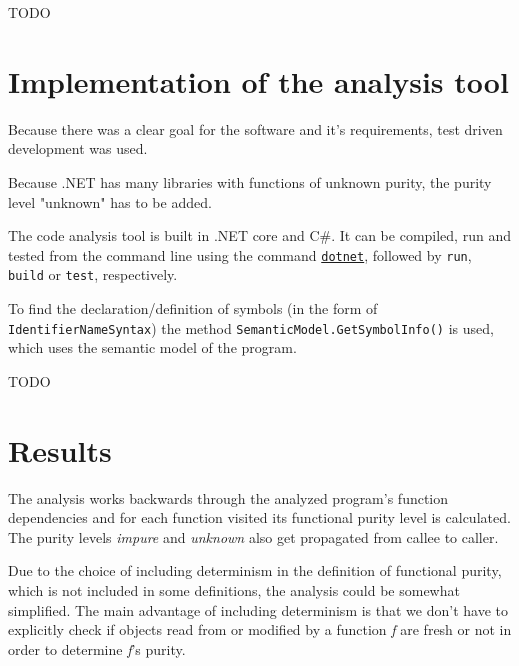 \documentclass[a4paper,12pt]{article}
\begin{document}
TODO

\section{Implementation of the analysis tool} \label{sec:Implementation of the analysis tool}


Because there was a clear goal for the software and it's requirements, test driven development was used.

Because .NET has many libraries with functions of unknown purity, the purity level "unknown" has to be added.

The code analysis tool is built in .NET core and C\#. It can be compiled, run and tested from the command line using the command \href{https://docs.microsoft.com/en-us/dotnet/core/tools/}{\texttt{dotnet}}, followed by \texttt{run}, \texttt{build} or \texttt{test}, respectively.

To find the declaration/definition of symbols (in the form of \texttt{IdentifierNameSyn\allowbreak tax}) the method \texttt{SemanticModel.GetSym\allowbreak bolInfo()} is used, which uses the semantic model of the program.


TODO

\section{Results} \label{sec:Results}
The analysis works backwards through the analyzed program's function dependencies and for each function visited its functional purity level is calculated. The purity levels \textit{impure} and \textit{unknown} also get propagated from callee to caller.

Due to the choice of including determinism in the definition of functional purity, which is not included in some definitions, the analysis could be somewhat simplified. The main advantage of including determinism is that we don't have to explicitly check if objects read from or modified by a function \textit{f} are fresh or not in order to determine \textit{f}'s purity.
\end{document}
